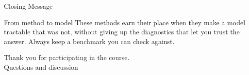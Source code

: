 \documentclass[aspectratio=169,11pt]{beamer}
\newcommand{\emphc}[1]{\textcolor{harvardcrimson}{#1}}
\begin{document}
\begin{frame}{Closing Message}
\begin{block}{From method to model}
These methods earn their place when they make a model \emphc{tractable} that was
not, without giving up the \emphc{diagnostics} that let you trust the answer.
Always keep a benchmark you can check against.
\end{block}

\vspace{0.5cm}
\begin{center}
{\Large Thank you for participating in the course.}\\[6pt]
{\LARGE \emphc{Questions and discussion}}
\end{center}
\end{frame}
\end{document}

